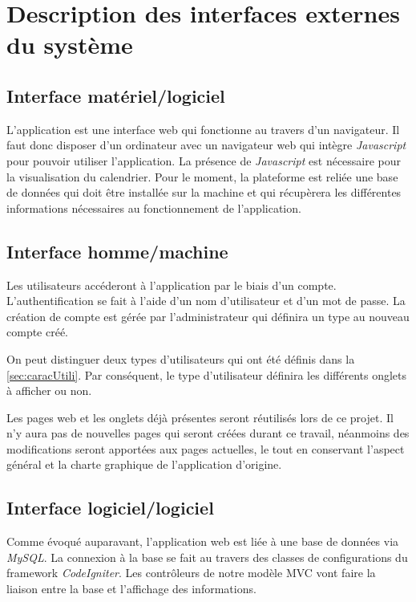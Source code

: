 \documentclass{polytech/polytech}
\begin{document}
\section{Description des interfaces externes du système}

\subsection{Interface matériel/logiciel}

L'application est une interface web qui fonctionne au travers d'un navigateur. Il faut donc disposer d'un ordinateur avec un navigateur web qui intègre \textit{Javascript} pour pouvoir utiliser l'application. La présence de \textit{Javascript} est nécessaire pour la visualisation du calendrier. Pour le moment, la plateforme est reliée une base de données qui doit être installée sur la machine et qui récupèrera les différentes informations nécessaires au fonctionnement de l'application. 


\subsection{Interface homme/machine}

Les utilisateurs accéderont à l'application par le biais d'un compte. L'authentification se fait à l'aide d'un nom d'utilisateur et d'un mot de passe. La création de compte est gérée par l'administrateur qui définira un type au nouveau compte créé.

On peut distinguer deux types d'utilisateurs qui ont été définis dans la \autoref{sec:caracUtili}. Par conséquent, le type d'utilisateur définira les différents onglets à afficher ou non. 

Les pages web et les onglets déjà présentes seront réutilisés lors de ce projet. Il n'y aura pas de nouvelles pages qui seront créées durant ce travail, néanmoins des modifications seront apportées aux pages actuelles, le tout en conservant l'aspect général et la charte graphique de l'application d'origine. 


\subsection{Interface logiciel/logiciel}

Comme évoqué auparavant, l'application web est liée à une base de données via \textit{MySQL}. La connexion à la base se fait au travers des classes de configurations du framework \textit{CodeIgniter}. Les contrôleurs de notre modèle MVC vont faire la liaison entre la base et l'affichage des informations. 
\end{document}
